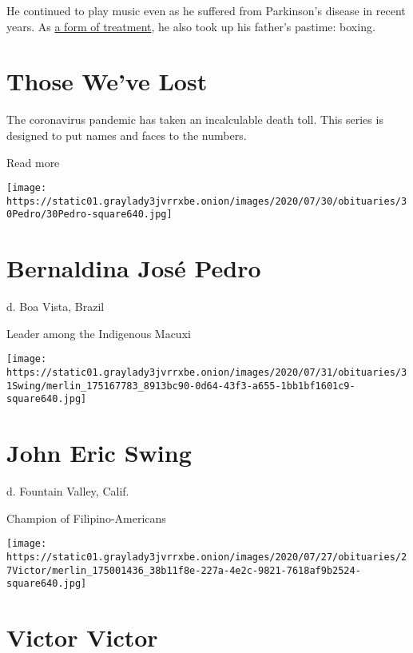 He continued to play music even as he suffered from Parkinson's disease
in recent years. As \href{https://www.rocksteadyboxing.org/}{a form of
treatment}, he also took up his father's pastime: boxing.

\href{https://www.nytimes3xbfgragh.onion/interactive/2020/obituaries/people-died-coronavirus-obituaries.html?action=click\&pgtype=Article\&state=default\&region=BELOW_MAIN_CONTENT\&context=covid_obits_promo}{}

\hypertarget{those-weve-lost}{%
\section{Those We've Lost}\label{those-weve-lost}}

The coronavirus pandemic has taken an incalculable death toll. This
series is designed to put names and faces to the numbers.

Read more

\texttt{[image: https://static01.graylady3jvrrxbe.onion/images/2020/07/30/obituaries/30Pedro/30Pedro-square640.jpg]}

\hypertarget{bernaldina-josuxe9-pedro}{%
\section{Bernaldina José Pedro}\label{bernaldina-josuxe9-pedro}}

d. Boa Vista, Brazil

Leader among the Indigenous Macuxi

\texttt{[image: https://static01.graylady3jvrrxbe.onion/images/2020/07/31/obituaries/31Swing/merlin\_175167783\_8913bc90-0d64-43f3-a655-1bb1bf1601c9-square640.jpg]}

\hypertarget{john-eric-swing}{%
\section{John Eric Swing}\label{john-eric-swing}}

d. Fountain Valley, Calif.

Champion of Filipino-Americans

\texttt{[image: https://static01.graylady3jvrrxbe.onion/images/2020/07/27/obituaries/27Victor/merlin\_175001436\_38b11f8e-227a-4e2c-9821-7618af9b2524-square640.jpg]}

\hypertarget{victor-victor}{%
\section{Victor Victor}\label{victor-victor}}

